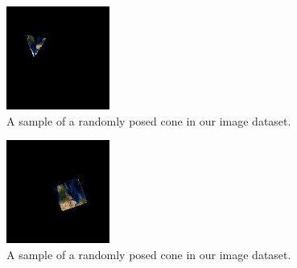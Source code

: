 \documentclass[journal]{IEEEtran}
\begin{document}
\begin{figure}[H]
	\hspace{-10 ex}

	\centering
	\includegraphics[width=.6\linewidth]{cone_450}

	\caption{A sample of a randomly posed cone in our image dataset.}
	\label{openglCone}
\end{figure}

\begin{figure}[H]
	\hspace{-10 ex}

	\centering
	\includegraphics[width=.6\linewidth]{cube_301}

	\caption{A sample of a randomly posed cone in our image dataset.}
	\label{openglCube}
\end{figure}
\end{document}
